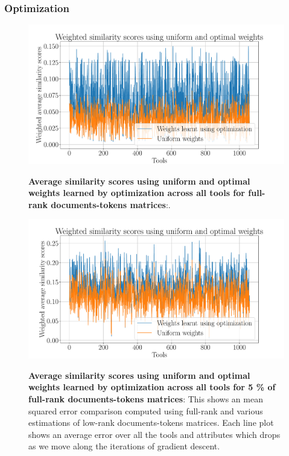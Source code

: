 \subsubsection{Optimization}

\begin{figure}[h]
\begin{centering}
    {\includegraphics[scale=0.35]{figures/Optimization_100_lsi.pdf}}
    \caption[Weighted similarity scores for full-rank]{\textbf{Average similarity scores using uniform and optimal weights learned by optimization across all tools for full-rank documents-tokens matrices}:.}
\end{centering}
\end{figure}


\begin{figure}[h]
\begin{centering}
    {\includegraphics[scale=0.35]{figures/Optimization_005_lsi.pdf}}
    \caption[Weighted similarity scores for 5 \% of full-rank]{\textbf{Average similarity scores using uniform and optimal weights learned by optimization across all tools for 5 \% of full-rank documents-tokens matrices}: This shows an mean squared error comparison computed using full-rank and various estimations of low-rank documents-tokens matrices. Each line plot shows an average error over all the tools and attributes which drops as we move along the iterations of gradient descent.}
\end{centering}
\end{figure}


